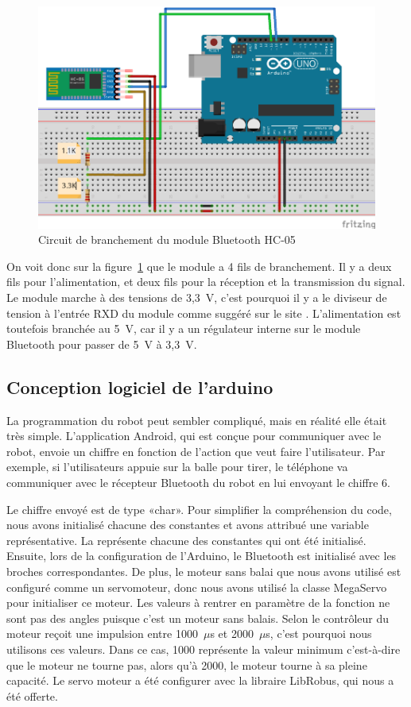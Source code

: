 \begin{figure}[h!]
    \centering
    \includegraphics[width=0.4\linewidth]{img/s2/elec/CircuitHC-05}
    \caption{Circuit de branchement du module Bluetooth HC-05}
    \label{fig:s2-elec-CircuitHC-05}
\end{figure}

On voit donc sur la figure~\ref{fig:s2-elec-CircuitHC-05} que le module a 4 fils de branchement.
Il y a deux fils pour l’alimentation, et deux fils pour la réception et la transmission du signal.
Le module marche à des tensions de 3,3~V, c’est pourquoi il y a le diviseur de tension à l’entrée RXD du module comme suggéré sur le site \cite{explore_embedded_setting_nodate}.
L’alimentation est toutefois branchée au 5~V, car il y a un régulateur interne sur le module Bluetooth pour passer de 5~V à 3,3~V.

\subsection{Conception logiciel de l'arduino}



La programmation du robot peut sembler compliqué, mais en réalité elle était très simple.
L’application Android, qui est conçue pour communiquer avec le robot, envoie un chiffre en fonction de l’action que veut faire l’utilisateur.
Par exemple, si l’utilisateurs appuie sur la balle pour tirer, le téléphone va communiquer avec le récepteur Bluetooth du robot en lui envoyant le chiffre 6.


Le chiffre envoyé est de type «char».
Pour simplifier la compréhension du code, nous avons initialisé chacune des constantes et avons attribué une variable représentative.
La  représente chacune des constantes qui ont été initialisé.
Ensuite, lors de la configuration de l'Arduino, le Bluetooth est initialisé avec les broches correspondantes.
De plus, le moteur sans balai que nous avons utilisé est configuré comme un servomoteur, donc nous avons utilisé la classe MegaServo pour initialiser ce moteur.
Les valeurs à rentrer en paramètre de la fonction ne sont pas des angles puisque c’est un moteur sans balais.
Selon \cite{arduino_arduino_2019} le contrôleur du moteur reçoit une impulsion entre 1000~$\mu$s et 2000~$\mu$s, c’est pourquoi nous utilisons ces valeurs.
Dans ce cas, 1000 représente la valeur minimum c’est-à-dire que le moteur ne tourne pas, alors qu’à 2000, le moteur tourne à sa pleine capacité.
Le servo moteur a été configurer avec la libraire LibRobus, qui nous a été offerte.

